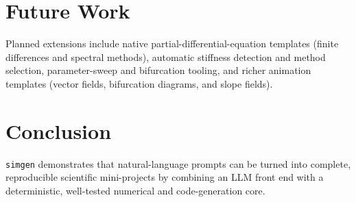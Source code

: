 \documentclass[11pt,a4paper]{article}
\begin{document}
\section{Future Work}
Planned extensions include native partial-differential-equation templates
(finite differences and spectral methods), automatic stiffness detection and
method selection, parameter-sweep and bifurcation tooling, and richer animation
templates (vector fields, bifurcation diagrams, and slope fields).

\section{Conclusion}
\texttt{simgen} demonstrates that natural-language prompts can be turned into
complete, reproducible scientific mini-projects by combining an LLM front end
with a deterministic, well-tested numerical and code-generation core.

\nocite{*}


\end{document}
